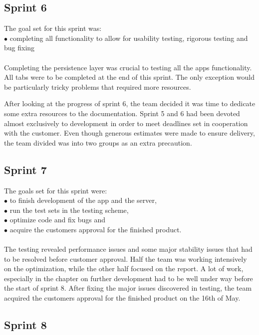 \subsection{Sprint 6}
The goal set for this sprint was:\\
$\bullet$\hspace{0.25cm} completing all functionality to allow for usability testing, rigorous testing and bug fixing\\\\
Completing the persistence layer was crucial to testing all the apps functionality. All tabs were to be completed at the end of this sprint. The only exception would be particularly tricky problems that required more resources.

After looking at the progress of sprint 6, the team decided it was time to dedicate some extra resources to the documentation. Sprint 5 and 6 had been devoted almost exclusively to development in order to meet deadlines set in cooperation with the customer. Even though generous estimates were made to ensure delivery, the team divided was into two groups as an extra precaution. 

\subsection{Sprint 7}
The goals set for this sprint were:\\
$\bullet$\hspace{0.25cm} to finish development of the app and the server,\\
$\bullet$\hspace{0.25cm} run the test sets in the testing scheme,\\
$\bullet$\hspace{0.25cm} optimize code and fix bugs and\\
$\bullet$\hspace{0.25cm} acquire the customers approval for the finished product.\\\\
The testing revealed performance issues and some major stability issues that had to be resolved before customer approval. Half the team was working intensively on the optimization, while the other half focused on the report. A lot of work, especially in the chapter on further development had to be well under way before the start of sprint 8. After fixing the major issues discovered in testing, the team acquired the customers approval for the finished product on the 16th of May.

\subsection{Sprint 8}
